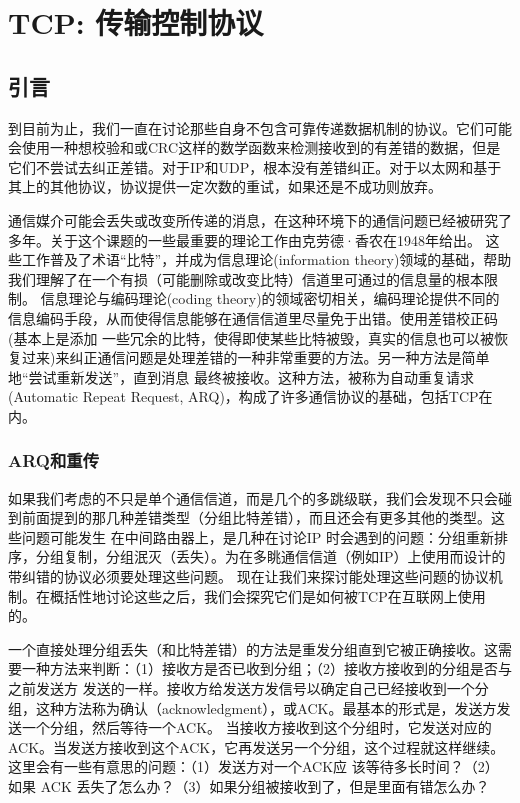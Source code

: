 \chapter{TCP: 传输控制协议}
\minitoc

\section{引言}
到目前为止，我们一直在讨论那些自身不包含可靠传递数据机制的协议。它们可能会使用一种想校验和或CRC这样的数学函数来检测接收到的有差错的数据，但是
它们不尝试去纠正差错。对于IP和UDP，根本没有差错纠正。对于以太网和基于其上的其他协议，协议提供一定次数的重试，如果还是不成功则放弃。

通信媒介可能会丢失或改变所传递的消息，在这种环境下的通信问题已经被研究了多年。关于这个课题的一些最重要的理论工作由克劳德·香农在1948年给出。
这些工作普及了术语“比特”，并成为信息理论(information theory)领域的基础，帮助我们理解了在一个有损（可能删除或改变比特）信道里可通过的信息量的根本限制。
信息理论与编码理论(coding theory)的领域密切相关，编码理论提供不同的信息编码手段，从而使得信息能够在通信信道里尽量免于出错。使用差错校正码(基本上是添加
一些冗余的比特，使得即使某些比特被毁，真实的信息也可以被恢复过来)来纠正通信问题是处理差错的一种非常重要的方法。另一种方法是简单地“尝试重新发送”，直到消息
最终被接收。这种方法，被称为自动重复请求 (Automatic Repeat Request, ARQ)，构成了许多通信协议的基础，包括TCP在内。
\subsection{ARQ和重传}
如果我们考虑的不只是单个通信信道，而是几个的多跳级联，我们会发现不只会碰到前面提到的那几种差错类型（分组比特差错），而且还会有更多其他的类型。这些问题可能发生
在中间路由器上，是几种在讨论IP 时会遇到的问题：分组重新排序，分组复制，分组泯灭（丢失）。为在多眺通信信道（例如IP）上使用而设计的带纠错的协议必须要处理这些问题。
现在让我们来探讨能处理这些问题的协议机制。在概括性地讨论这些之后，我们会探究它们是如何被TCP在互联网上使用的。

一个直接处理分组丢失（和比特差错）的方法是重发分组直到它被正确接收。这需要一种方法来判断：（1）接收方是否已收到分组；（2）接收方接收到的分组是否与之前发送方
发送的一样。接收方给发送方发信号以确定自己已经接收到一个分组，这种方法称为确认（acknowledgment），或ACK。最基本的形式是，发送方发送一个分组，然后等待一个ACK。
当接收方接收到这个分组时，它发送对应的ACK。当发送方接收到这个ACK，它再发送另一个分组，这个过程就这样继续。这里会有一些有意思的问题：（1）发送方对一个ACK应
该等待多长时间？（2）如果 ACK 丢失了怎么办？（3）如果分组被接收到了，但是里面有错怎么办？

